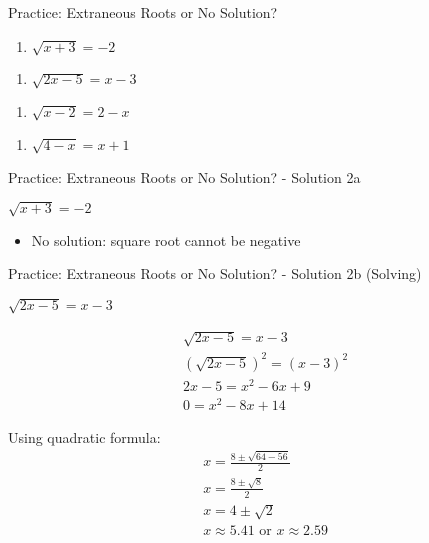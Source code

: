 \documentclass[aspectratio=169]{beamer}
\begin{document}
\begin{frame}{Practice: Extraneous Roots or No Solution?}
\begin{tcolorbox}[colback=lightgray,colframe=accent,title=Practice Problems]
\footnotesize
\begin{enumerate}
  \item $\sqrt{x+3} = -2$
\end{enumerate}
\begin{enumerate}
  \item $\sqrt{2x-5} = x-3$
\end{enumerate}
\begin{enumerate}
  \item $\sqrt{x-2} = 2-x$
\end{enumerate}
\begin{enumerate}
  \item $\sqrt{4-x} = x+1$
\end{enumerate}
\end{tcolorbox}
\end{frame}

\begin{frame}{Practice: Extraneous Roots or No Solution? - Solution 2a}
\begin{tcolorbox}[colback=lightgray,colframe=primary,title=Solution 2a]
\footnotesize
$\sqrt{x+3} = -2$

\vspace{0.5em}

\begin{itemize}
  \item No solution: square root cannot be negative
\end{itemize}
\end{tcolorbox}
\end{frame}

\begin{frame}{Practice: Extraneous Roots or No Solution? - Solution 2b (Solving)}
\begin{tcolorbox}[colback=lightgray,colframe=primary,title=Solution 2b -- Solving]
\footnotesize
$\sqrt{2x-5} = x-3$

\begin{align*}
  &\sqrt{2x-5} = x-3 \\
  &(\sqrt{2x-5})^2 = (x-3)^2 \\
  &2x-5 = x^2-6x+9 \\
  &0 = x^2-8x+14
\end{align*}

Using quadratic formula:
\begin{align*}
  &x = \frac{8 \pm \sqrt{64-56}}{2} \\
  &x = \frac{8 \pm \sqrt{8}}{2} \\
  &x = 4 \pm \sqrt{2} \\
  &x \approx 5.41 \text{ or } x \approx 2.59
\end{align*}
\end{tcolorbox}
\end{frame}
\end{document}

